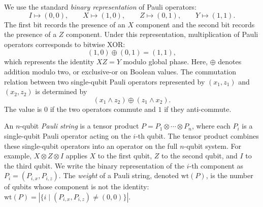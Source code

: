\documentclass[acmsmall,screen,review,anonymous,nonacm]{acmart}
\begin{document}
We use the standard \emph{binary representation} of Pauli operators:
\[
I \mapsto (0,0), \qquad
X \mapsto (1,0), \qquad
Z \mapsto (0,1), \qquad
Y \mapsto (1,1).
\]
The first bit records the presence of an $X$ component and the second bit records the presence of a $Z$ component. Under this representation, multiplication of Pauli operators corresponds to bitwise XOR:
\[
(1,0)\oplus(0,1)=(1,1),
\]
which represents the identity $XZ=Y$ modulo global phase. Here, $\oplus$ denotes addition modulo two, or exclusive-or on Boolean values. The commutation relation between two single-qubit Pauli operators represented by $(x_1,z_1)$ and $(x_2,z_2)$ is determined by
\[
(x_1 \land z_2) \oplus (z_1 \land x_2).
\]
The value is $0$ if the two operators commute and $1$ if they anti-commute.

An $n$-qubit \emph{Pauli string} is a tensor product $P=P_1\otimes\cdots\otimes P_n$, where each $P_i$ is a single-qubit Pauli operator acting on the $i$-th qubit. The tensor product combines these single-qubit operators into an operator on the full $n$-qubit system. For example, $X\otimes Z\otimes I$ applies $X$ to the first qubit, $Z$ to the second qubit, and $I$ to the third qubit. We write the binary representation of the $i$-th component as $P_i=(P_{i,x},P_{i,z})$.
The \emph{weight} of a Pauli string, denoted $\mathrm{wt}(P)$, is the number of qubits whose component is not the identity: $\mathrm{wt}(P)=
\left|\{i \mid (P_{i,x},P_{i,z})\neq(0,0)\}\right|$.


\end{document}
